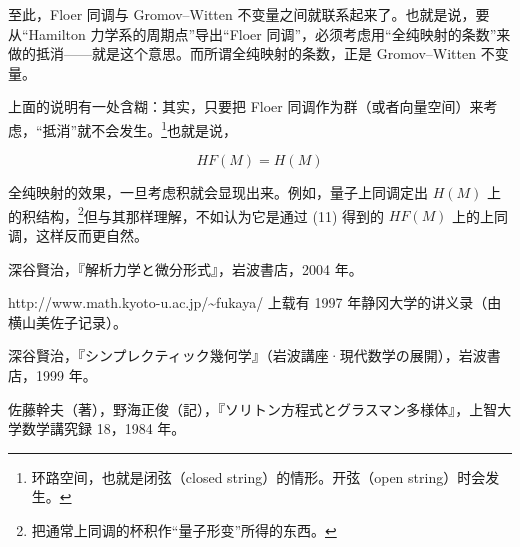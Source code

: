 至此，Floer 同调与 Gromov--Witten 不变量之间就联系起来了。也就是说，要从“Hamilton 力学系的周期点”导出“Floer 同调”，必须考虑用“全纯映射的条数”来做的抵消——就是这个意思。而所谓全纯映射的条数，正是 Gromov--Witten 不变量。

上面的说明有一处含糊：其实，只要把 Floer 同调作为群（或者向量空间）来考虑，“抵消”就不会发生。\footnote{环路空间，也就是闭弦（closed string）的情形。开弦（open string）时会发生。}也就是说，

\[ HF(M)=H(M) \tag{11} \]

全纯映射的效果，一旦考虑积就会显现出来。例如，量子上同调定出 $H(M)$ 上的积结构，\footnote{把通常上同调的杯积作“量子形变”所得的东西。}但与其那样理解，不如认为它是通过 (11) 得到的 $HF(M)$ 上的上同调，这样反而更自然。



\begin{reflist}
  \item[{[1]}] 深谷賢治，『解析力学と微分形式』，岩波書店，2004 年。
  \item[{[2]}] http://www.math.kyoto-u.ac.jp/\~{}fukaya/ 上载有 1997 年静冈大学的讲义录（由横山美佐子记录）。
  \item[{[3]}] 深谷賢治，『シンプレクティック幾何学』（岩波講座·現代数学の展開），岩波書店，1999 年。
  \item[{[4]}] 佐藤幹夫（著），野海正俊（記），『ソリトン方程式とグラスマン多様体』，上智大学数学講究録 18，1984 年。
\end{reflist}

\renewcommand{\thesection}{\Roman{section}}

